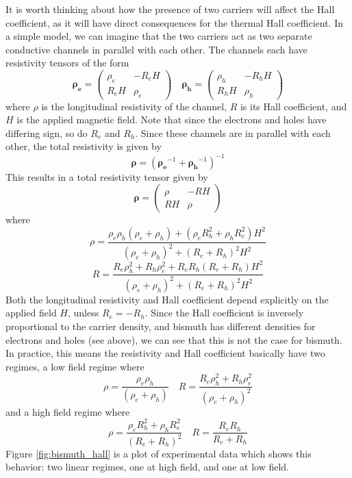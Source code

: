 \documentclass{thesis-umich}
\begin{document}
It is worth thinking about how the presence of two carriers will affect the Hall coefficient, as it will have direct consequences for the thermal Hall coefficient. In a simple model, we can imagine that the two carriers act as two separate conductive channels in parallel with each other. The channels each have resistivity tensors of the form
\[ \mathbf{\rho_e} = \begin{pmatrix}
		\rho_e & -R_eH \\
	R_eH & \rho_e \end{pmatrix} \quad
   \mathbf{\rho_h} = \begin{pmatrix}
   		\rho_h & -R_hH \\
	R_hH & \rho_h \end{pmatrix}\]
where $\rho$ is the longitudinal resistivity of the channel, $R$ is its Hall coefficient, and $H$ is the applied magnetic field. Note that since the electrons and holes have differing sign, so do $R_e$ and $R_h$. Since these channels are in parallel with each other, the total resistivity is given by 
\[ \mathbf{\rho} = \left(\mathbf{\rho_e}^{-1} + \mathbf{\rho_h}^{-1}\right)^{-1} \]
This results in a total resistivity tensor given by
\[ \mathbf{\rho} = \begin{pmatrix}
		\rho & -RH \\
		RH & \rho \end{pmatrix} \]
where
\[ \rho = \frac{\rho_e \rho_h(\rho_e + \rho_h) + (\rho_e R_h^2 + \rho_h R_e^2)H^2}{(\rho_e + \rho_h)^2 + (R_e + R_h)^2H^2}\]
\[ R = \frac{R_e \rho_h^2 + R_h \rho_e^2 + R_e R_h (R_e + R_h)H^2}{(\rho_e + \rho_h)^2 + (R_e + R_h)^2 H^2} \]
Both the longitudinal resistivity and Hall coefficient depend explicitly on the applied field $H$, unless $R_e = -R_h$. Since the Hall coefficient is inversely proportional to the carrier density, and bismuth has different densities for electrons and holes (see above), we can see that this is not the case for bismuth. In practice, this means the resistivity and Hall coefficient basically have two regimes, a low field regime where
\[ \rho = \frac{\rho_e \rho_h}{(\rho_e + \rho_h)} \quad R = \frac{R_e \rho_h^2 + R_h \rho_e^2}{(\rho_e + \rho_h)^2} \]
and a high field regime where
\[ \rho = \frac{\rho_e R_h^2 + \rho_h R_e^2}{(R_e + R_h)^2} \quad R = \frac{R_e R_h}{R_e + R_h} \]
Figure \ref{fig:bismuth_hall} is a plot of experimental data which shows this behavior: two linear regimes, one at high field, and one at low field.
\end{document}
